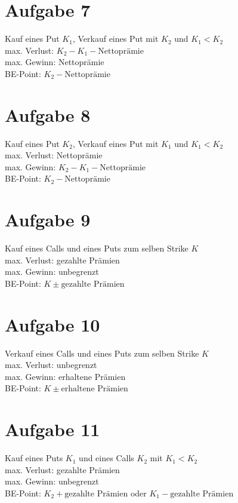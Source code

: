 \documentclass{article}
\begin{document}
	\section*{Aufgabe 7}
	Kauf eines Put $K_1$, Verkauf eines Put mit $K_2$ und $K_1 < K_2$ \\
	max. Verlust: $K_2 - K_1 - \text{Nettoprämie}$ \\
	max. Gewinn: Nettoprämie \\
	BE-Point: $K_2 - \text{Nettoprämie}$
	
	\section*{Aufgabe 8}
	Kauf eines Put $K_2$, Verkauf eines Put mit $K_1$ und $K_1 < K_2$ \\
	max. Verlust: Nettoprämie \\
	max. Gewinn: $K_2 - K_1 - \text{Nettoprämie}$ \\
	BE-Point: $K_2 - \text{Nettoprämie}$
	
	\section*{Aufgabe 9}
	Kauf eines Calls und eines Puts zum selben Strike $K$ \\
	max. Verlust: gezahlte Prämien \\
	max. Gewinn: unbegrenzt \\
	BE-Point: $K \pm \text{gezahlte Prämien}$
	
	\section*{Aufgabe 10}
	Verkauf eines Calls und eines Puts zum selben Strike $K$ \\
	max. Verlust: unbegrenzt \\
	max. Gewinn: erhaltene Prämien \\
	BE-Point: $K \pm \text{erhaltene Prämien}$
	
	\section*{Aufgabe 11}
	Kauf eines Puts $K_1$ und eines Calls $K_2$ mit $K_1 < K_2$ \\
	max. Verlust: gezahlte Prämien \\
	max. Gewinn: unbegrenzt \\
	BE-Point: $K_2 + \text{gezahlte Prämien}$ oder $K_1 - \text{gezahlte Prämien}$
	
\end{document}
